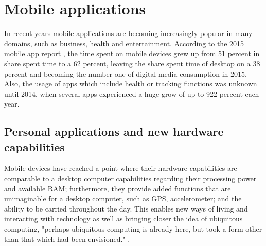 \section{Mobile applications}
In recent years mobile applications are becoming increasingly popular in many domains, such as business, health and entertainment. According to the 2015 mobile app report \cite{ComScore}, the time spent on mobile devices grew up from 51 percent in share spent time to a 62 percent, leaving the share spent time of desktop on a 38 percent and becoming the number one of digital media consumption in 2015. Also, the usage of apps which include health or tracking functions was unknown until 2014, when several apps experienced a huge grow of up to 922 percent each year. 

\subsection{Personal applications and new hardware capabilities}

Mobile devices have reached a point where their hardware capabilities are comparable to a desktop computer capabilities regarding their processing power and available RAM; furthermore, they provide added functions that are unimaginable for a desktop computer, such as GPS, accelerometer; and the ability to be carried throughout the day. This enables new ways of living and interacting with technology as well as bringing closer the idea of ubiquitous computing, "perhaps ubiquitous computing is already here, but took a form other than that which had been envisioned." \cite{Bell2007}. 


